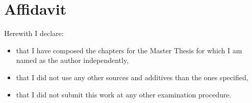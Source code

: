 \section*{Affidavit}
\label{sec:affidavit}
\pagestyle{plain}

Herewith I declare:
\begin{itemize}
\item that I have composed the chapters for the Master Thesis for which I am named as the author independently,
\item that I did not use any other sources and additives than the ones specified,
\item that I did not submit this work at any other examination procedure.
\end{itemize}

\begin{verbatim}

\end{verbatim}
   